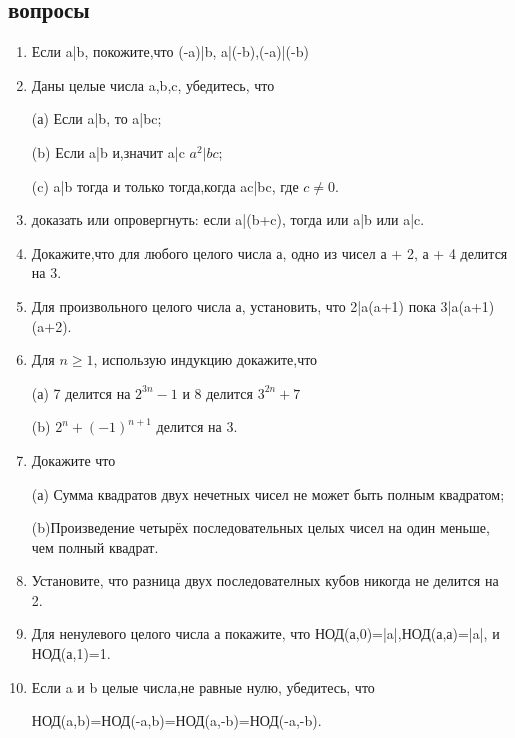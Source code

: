 \documentclass[11pt]{article}
\begin{document}
\subsection{вопросы}
\begin{enumerate}
\item Если a|b, покожите,что (-a)|b, a|(-b),(-a)|(-b)
\item Даны целые числа a,b,c, убедитесь, что
\begin{flushleft}
	(а)  Если a|b, то a|bc;
\end{flushleft}
\begin{flushleft}
	(b) Если  a|b и,значит a|c $a^{2}|bc$;
\end{flushleft}
\begin{flushleft}
	(c)  a|b тогда и только тогда,когда ac|bc, где $c \neq 0$.
\end{flushleft}

\item доказать или опровергнуть: если a|(b+c), тогда или a|b или a|c.
\item Докажите,что для любого целого числа а, одно из чисел а + 2, а + 4 делится на 3.
\item Для произвольного целого числа а, установить, что 2|a(a+1) пока 3|a(a+1)(a+2).
\item Для $n\ge 1$, использую индукцию докажите,что
\begin{flushleft}
	(а)  7 делится на $2^{3n}-1$ и 8 делится $3^{2n}+7$
\end{flushleft}
\begin{flushleft}
	(b) $2^{n}+(-1)^{n+1}$ делится на 3.
\end{flushleft}
\item Докажите что
\begin{flushleft}
	(а)  Сумма квадратов двух нечетных чисел не может быть полным квадратом;
\end{flushleft}
\begin{flushleft}
	(b)Произведение четырёх последовательных целых чисел на один меньше, чем полный квадрат.
\end{flushleft}
\item Установите, что разница двух последователных кубов никогда не делится на 2.
\item Для ненулевого целого числа а покажите, что НОД(а,0)=|a|,НОД(а,а)=|a|, и НОД(а,1)=1.
\item  Если a и b целые числа,не равные нулю, убедитесь, что
\begin{center}
	НОД(a,b)=НОД(-a,b)=НОД(a,-b)=НОД(-a,-b).
\end{center}


\end{enumerate}
\end{document}
